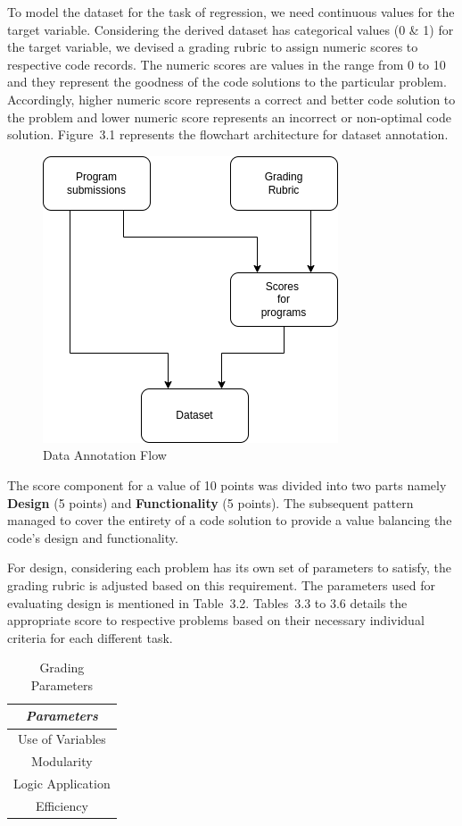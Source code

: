 To model the dataset for the task of regression, we need
continuous values for the target variable. Considering the
derived dataset has categorical values (0 \& 1) for the
target variable, we devised a grading rubric to assign
numeric scores to respective code records. The numeric scores
are values in the range from 0 to 10 and they represent the
goodness of the code solutions to the particular
problem. Accordingly, higher numeric score represents a
correct and better code solution to the problem and lower
numeric score represents an incorrect or non-optimal code
solution.  Figure~3.1 represents the flowchart architecture
for dataset annotation.

\begin{figure}[h]
\centering
\includegraphics{./figures/data.png}
\caption{Data Annotation Flow}
\label{fig1}
\end{figure}

The score component for a value of 10 points was divided into
two parts namely \textbf{Design} (5 points) and
\textbf{Functionality} (5 points). The subsequent pattern
managed to cover the entirety of a code solution to provide a
value balancing the code's design and functionality.


For design, considering each problem has its own set of
parameters to satisfy, the grading rubric is adjusted based
on this requirement. The parameters used for evaluating
design is mentioned in Table~3.2. Tables~3.3 to 3.6 details
the appropriate score to respective problems based on their
necessary individual criteria for each different task.
        
        
\begin{table}[H]
\centering
\caption{Grading Parameters}
\begin{tabular}{|c|}
\hline
\emph{Parameters} \\ \hline
Use of Variables \\ \hline
Modularity \\ \hline
Logic Application \\ \hline
Efficiency \\ \hline
\end{tabular}

\label{tab:params}
\end{table}


